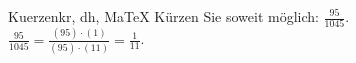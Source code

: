 \begin{MAufgabe}{Kuerzen}{kr, dh, MaTeX}
K\"urzen Sie soweit m\"oglich: $\frac{95}{1045}$.\\ 
\ifLsg\MLoesung
\quad $\frac{95}{1045}=\frac{(95)\cdot(1)}{(95)\cdot(11)}=\frac{1}{11}$.\else\relax\fi
 \end{MAufgabe}